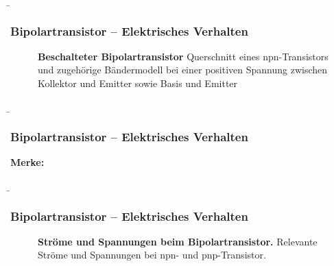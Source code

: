 \begin{frame}
    \b{ \frametitle{Bipolartransistor -- Elektrisches Verhalten}
        \begin{figure}[H]
            \centering
            
            \caption{\textbf{Beschalteter Bipolartransistor} Querschnitt eines npn-Transistors und zugehörige Bändermodell bei einer positiven Spannung zwischen Kollektor und Emitter sowie Basis und Emitter}  
        \end{figure}
        }
\end{frame}

\begin{frame}
    \b{\frametitle{Bipolartransistor -- Elektrisches Verhalten}
        \textbf{Merke:}
        \begin{itemize}
        \end{itemize}
        }
\end{frame}

\begin{frame}
    \b{ \frametitle{Bipolartransistor -- Elektrisches Verhalten}    
        \begin{figure}[H]
            \caption{\textbf{Ströme und Spannungen beim Bipolartransistor.} Relevante Ströme und Spannungen bei npn- und pnp-Transistor.}  
        \end{figure}
    }
\end{frame}

